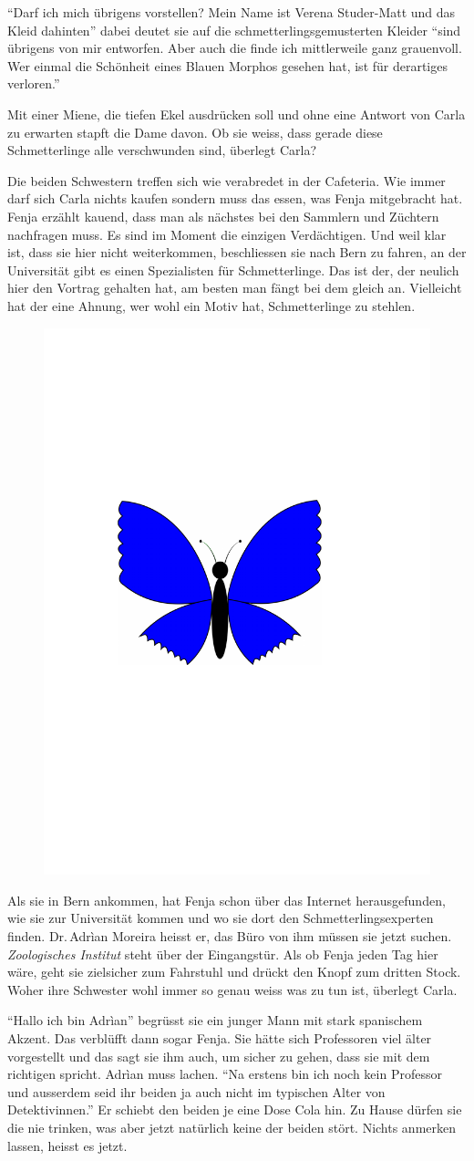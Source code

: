 \enquote{Darf ich mich übrigens vorstellen? Mein Name ist Verena Studer-Matt und das Kleid dahinten} dabei deutet sie auf die schmetterlingsgemusterten Kleider \enquote{sind übrigens von mir entworfen. Aber auch die finde ich mittlerweile ganz grauenvoll. Wer einmal die Schönheit eines Blauen Morphos gesehen hat, ist für derartiges verloren.} 


Mit einer Miene, die tiefen Ekel ausdrücken soll und ohne eine Antwort von Carla zu erwarten stapft die Dame davon. Ob sie weiss, dass gerade diese Schmetterlinge alle verschwunden sind, überlegt Carla?

Die beiden Schwestern treffen sich wie verabredet in der Cafeteria. Wie immer darf sich Carla nichts kaufen sondern muss das essen, was Fenja mitgebracht hat. Fenja erzählt kauend, dass man als nächstes bei den Sammlern und Züchtern nachfragen muss. Es sind im Moment die einzigen Verdächtigen. Und weil klar ist, dass sie hier nicht weiterkommen, beschliessen sie nach Bern zu fahren, an der Universität gibt es einen Spezialisten für Schmetterlinge. Das ist der, der neulich hier den Vortrag gehalten hat, am besten man fängt bei dem gleich an. Vielleicht hat der eine Ahnung, wer wohl ein Motiv hat, Schmetterlinge zu stehlen.
\begin{figure}[H]
\centering
\includegraphics[width=.05\textwidth]{bilder/inkling.pdf}
\end{figure}
 Als sie in Bern ankommen, hat Fenja schon über das Internet herausgefunden, wie sie zur Universität kommen und wo sie dort den Schmetterlingsexperten finden. Dr.\,Adrìan Moreira heisst er, das Büro von ihm müssen sie jetzt suchen. \emph{Zoologisches Institut} steht über der Eingangstür. Als ob Fenja jeden Tag hier wäre, geht sie zielsicher zum Fahrstuhl und drückt den Knopf zum dritten Stock. Woher ihre Schwester wohl immer so genau weiss was zu tun ist, überlegt Carla.

\enquote{Hallo ich bin Adrìan} begrüsst sie ein junger Mann mit stark spanischem Akzent. Das verblüfft dann sogar Fenja. Sie hätte sich Professoren viel älter vorgestellt und das sagt sie ihm auch, um sicher zu gehen, dass sie mit dem richtigen spricht. Adrìan muss lachen. \enquote{Na erstens bin ich noch kein Professor und ausserdem seid ihr beiden ja auch nicht im typischen Alter von Detektivinnen.} Er schiebt den beiden je eine Dose Cola hin. Zu Hause dürfen sie die nie trinken, was aber jetzt natürlich keine der beiden stört. Nichts anmerken lassen, heisst es jetzt.

